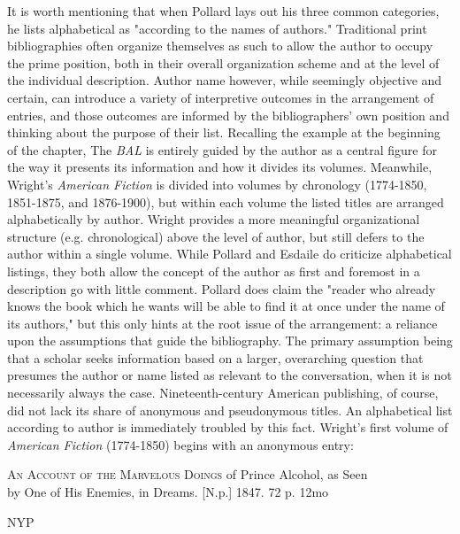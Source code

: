 It is worth mentioning that when Pollard lays out his three common categories, he lists alphabetical as "according to the names of authors."\autocite[133]{pollard_arrangment_1976} Traditional print bibliographies often organize themselves as such to allow the author to occupy the prime position, both in their overall organization scheme and at the level of the individual description. Author name however, while seemingly objective and certain, can introduce a variety of interpretive outcomes in the arrangement of entries, and those outcomes are informed by the bibliographers' own position and thinking about the purpose of their list. Recalling the example at the beginning of the chapter, The \textit{BAL} is entirely guided by the author as a central figure for the way it presents its information and how it divides its volumes. Meanwhile, Wright's \textit{American Fiction} is divided into volumes by chronology (1774-1850, 1851-1875, and 1876-1900), but within each volume the listed titles are arranged alphabetically by author. Wright provides a more meaningful organizational structure (e.g. chronological) above the level of author, but still defers to the author within a single volume. While Pollard and Esdaile do criticize alphabetical listings, they both allow the concept of the author as first and foremost in a description go with little comment. Pollard does claim the "reader who already knows the book which he wants will be able to find it at once under the name of its authors," but this only hints at the root issue of the arrangement: a reliance upon the assumptions that guide the bibliography.\autocite[134]{pollard_arrangment_1976} The primary assumption being that a scholar seeks information based on a larger, overarching question that presumes the author or name listed as relevant to the conversation, when it is not necessarily always the case. Nineteenth-century American publishing, of course, did not lack its share of anonymous and pseudonymous titles. An alphabetical list according to author is immediately troubled by this fact. Wright's first volume of \textit{American Fiction} (1774-1850) begins with an anonymous entry: 

\begin{displayquote}
\textsc{An Account of the Marvelous Doings} of Prince Alcohol, as Seen \\ \hspace*{1 pc} by One of His Enemies, in Dreams.  [N.p.]  1847.  72 p.  12mo \begin{flushright}
\vspace*{-5mm} \textsc{NYP}\autocite[1]{wright_american_1939}\end{flushright}
\end{displayquote}


